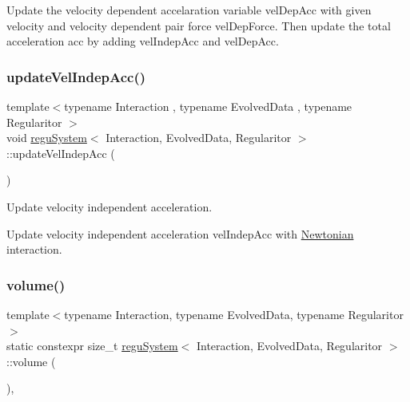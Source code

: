 Update the velocity dependent accelaration variable \textquotesingle{}vel\+Dep\+Acc\textquotesingle{} with given velocity and velocity dependent pair force \textquotesingle{}vel\+Dep\+Force\textquotesingle{}. Then update the total acceleration \textquotesingle{}acc\textquotesingle{} by adding \textquotesingle{}vel\+Indep\+Acc\textquotesingle{} and \textquotesingle{}vel\+Dep\+Acc\textquotesingle{}. \mbox{\label{classregu_system_a9ef1a5d582d3764adf3f3f35e5fac431}} 
\subsubsection{\texorpdfstring{update\+Vel\+Indep\+Acc()}{updateVelIndepAcc()}}
{\footnotesize\ttfamily template$<$typename Interaction , typename Evolved\+Data , typename Regularitor $>$ \\
void \mbox{\hyperlink{classregu_system}{regu\+System}}$<$ Interaction, Evolved\+Data, Regularitor $>$\+::update\+Vel\+Indep\+Acc (\begin{DoxyParamCaption}{ }\end{DoxyParamCaption})\hspace{0.3cm}{\ttfamily [private]}}



Update velocity independent acceleration. 

Update velocity independent acceleration \textquotesingle{}vel\+Indep\+Acc\textquotesingle{} with \mbox{\hyperlink{class_newtonian}{Newtonian}} interaction. \mbox{\label{classregu_system_a4260b237d36d137b01504c0effd385fa}} 
\subsubsection{\texorpdfstring{volume()}{volume()}}
{\footnotesize\ttfamily template$<$typename Interaction, typename Evolved\+Data, typename Regularitor$>$ \\
static constexpr size\+\_\+t \mbox{\hyperlink{classregu_system}{regu\+System}}$<$ Interaction, Evolved\+Data, Regularitor $>$\+::volume (\begin{DoxyParamCaption}{ }\end{DoxyParamCaption})\hspace{0.3cm}{\ttfamily [inline]}, {\ttfamily [static]}}



